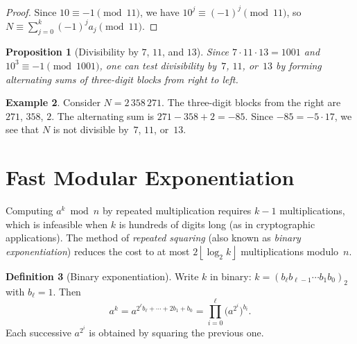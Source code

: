 \documentclass[12pt,a4paper,openany]{book}
\theoremstyle{definition}
\newtheorem{definition}{Definition}[chapter]
\newtheorem{example}[definition]{Example}
\theoremstyle{plain}
\newtheorem{proposition}[definition]{Proposition}
\theoremstyle{remark}
\newcommand{\floor}[1]{\left\lfloor #1 \right\rfloor}
\begin{document}
\begin{proof}
Since $10 \equiv -1 \pmod{11}$, we have $10^j \equiv (-1)^j \pmod{11}$, so
$N \equiv \sum_{j=0}^{k} (-1)^j a_j \pmod{11}$.
\end{proof}

\begin{proposition}[Divisibility by $7$, $11$, and $13$]
\label{prop:div-7-11-13}
Since $7 \cdot 11 \cdot 13 = 1001$ and $10^3 \equiv -1 \pmod{1001}$,
one can test divisibility by~$7$, $11$, or~$13$ by forming
alternating sums of three-digit blocks from right to left.
\end{proposition}

\begin{example}
\label{ex:div-criteria}
Consider $N = 2\,358\,271$.  The three-digit blocks from the right are
$271$, $358$, $2$.  The alternating sum is $271 - 358 + 2 = -85$.
Since $-85 = -5 \cdot 17$, we see that $N$ is not divisible by~$7$,
$11$, or~$13$.
\end{example}

\section{Fast Modular Exponentiation}
\label{sec:fast-exp}

Computing $a^k \bmod n$ by repeated multiplication requires $k-1$
multiplications, which is infeasible when $k$ is hundreds of digits long
(as in cryptographic applications).  The method of \emph{repeated squaring}
(also known as \emph{binary exponentiation})
reduces the cost to at most $2\floor{\log_2 k}$ multiplications modulo~$n$.

\begin{definition}[Binary exponentiation]
\label{def:binary-exp}
Write $k$ in binary: $k = (b_\ell b_{\ell-1} \cdots b_1 b_0)_2$ with
$b_\ell = 1$.  Then
\[
  a^k = a^{2^\ell b_\ell + \cdots + 2 b_1 + b_0}
      = \prod_{i=0}^{\ell} \bigl(a^{2^i}\bigr)^{b_i}.
\]
Each successive $a^{2^i}$ is obtained by squaring the previous one.
\end{definition}
\end{document}
